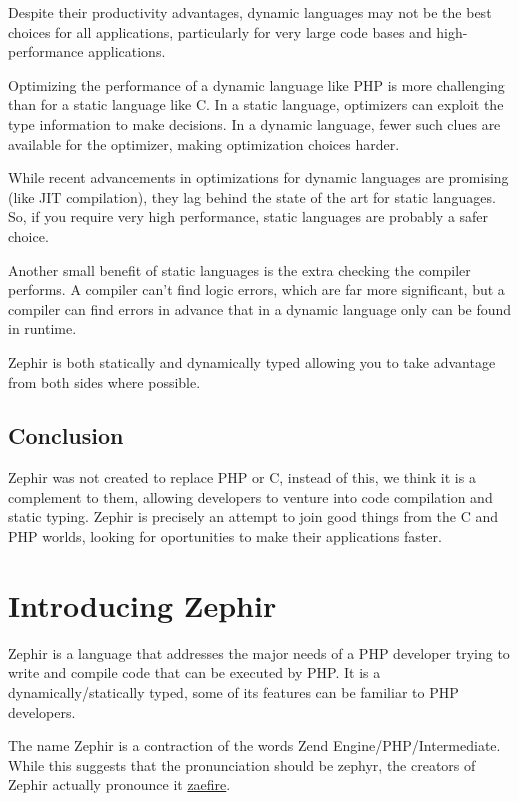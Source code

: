\documentclass[letterpaper,10pt,english]{sphinxmanual}
\begin{document}
Despite their productivity advantages, dynamic languages may not be the best choices for all applications,
particularly for very large code bases and high-performance applications.

Optimizing the performance of a dynamic language like PHP is more challenging than for a static language like C.
In a static language, optimizers can exploit the type information to make decisions. In a dynamic language,
fewer such clues are available for the optimizer, making optimization choices harder.

While recent advancements in optimizations for dynamic languages are promising (like JIT compilation),
they lag behind the state of the art for static languages. So, if you require very high performance,
static languages are probably a safer choice.

Another small benefit of static languages is the extra checking the compiler performs.
A compiler can’t find logic errors, which are far more significant,
but a compiler can find errors in advance that in a dynamic language only can be
found in runtime.

Zephir is both statically and dynamically typed allowing you to take advantage from both sides where
possible.


\subsection{Conclusion}
\label{motivation:conclusion}
Zephir was not created to replace PHP or C, instead of this, we think it is a complement to them,
allowing developers to venture into code compilation and static typing.
Zephir is precisely an attempt to join good things from the C and PHP worlds, looking for oportunities
to make their applications faster.


\section{Introducing Zephir}
\label{intro::doc}\label{intro:introducing-zephir}
Zephir is a language that addresses the major needs of a PHP developer trying to write and compile code that
can be executed by PHP. It is a dynamically/statically typed, some of its features can be familiar to
PHP developers.

The name Zephir is a contraction of the words Zend Engine/PHP/Intermediate. While this suggests that the
pronunciation should be zephyr, the creators of Zephir actually pronounce it \href{http://translate.google.com/\#en/en/zaefire}{zaefire}.
\end{document}
